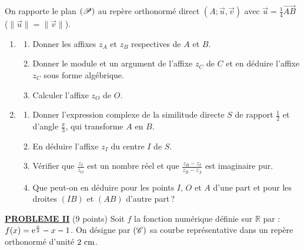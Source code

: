       On rapporte le plan $(\mathscr{P})$ au rep\`ere orthonorm\'e direct 
      $(A;\vec{u},\vec{v})$ avec $\vec{u} = \frac{1}{4} \overrightarrow{AB}$ ($\|\vec{u}\| = \|\vec{v}\|$).
      \begin{enumerate}
            \item \begin{enumerate}
                        \item Donner les affixes $z_A$ et $z_B$ respectives de $A$ et $B$.
                        \item Donner le module et un argument de l'affixe $z_C$ de $C$ et en d\'eduire l'affixe $z_C$
                              sous forme alg\'ebrique.
                        \item Calculer l'affixe $z_O$ de $O$.
                  \end{enumerate}
            \item \begin{enumerate}
                        \item Donner l'expression complexe de la similitude directe 
                              $S$ de rapport $\frac{1}{2}$ et d'angle $\frac{\pi}{3}$, qui transforme $A$ en $B$.
                        \item En d\'eduire l'affixe $z_I$ du centre $I$ de $S$.
                        \item V\'erifier que $\frac{z_I}{z_O}$ est un nombre r\'eel et que 
                              $\frac{z_B - z_I}{z_B - z_A}$ est imaginaire pur.
                        \item Que peut-on en d\'eduire pour les points $I$, $O$ et $A$ d'une part
                              et pour les droites $(IB)$ et $(AB)$ d'autre part\,?
                  \end{enumerate}
      \end{enumerate}
\noindent \underline{\textsc{\textbf{PROBLEME II}}} (9 points) \newline
      Soit $f$ la fonction num\'erique d\'efinie sur $\mathbb{R}$ par : $f(x) = \mathrm{e}^{\frac{x}{2}} - x - 1$.
      On d\'esigne par $(\mathscr{C})$ sa courbe repr\'esentative dans un rep\`ere orthonorm\'e \Oij{} d'unit\'e $2~\mathrm{cm}$.
